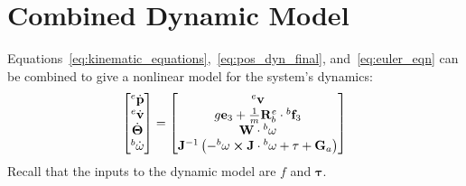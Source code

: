 \documentclass{article}
\begin{document}
		
	\section*{Combined Dynamic Model}
		Equations~\ref{eq:kinematic_equations},~\ref{eq:pos_dyn_final}, and~\ref{eq:euler_eqn} can be combined to give a nonlinear model for the system's dynamics:
		\begin{equation}
			\begin{bmatrix} {}^e \dot{\mathbf{p}} \\ {}^e \dot{\mathbf{v}} \\ \dot{\mathbf{\Theta}} \\ {}^b\dot{\mathbf{\omega}} \end{bmatrix}
			 = 
			 \begin{bmatrix}
			 	{}^e \mathbf{v} \\
			 	g \mathbf{e}_3 + \frac{1}{m}\mathbf{R}_b^e\cdot{}^b\mathbf{f}_3 \\
			 	\mathbf{W} \cdot {}^b\mathbf{\omega} \\
			 	\mathbf{J}^{-1}\left(-{}^b\mathbf{\omega} \cross \mathbf{J}\cdot{}^b\mathbf{\omega} +  \mathbf{\tau} + \mathbf{G}_a\right)
			 \end{bmatrix}
		\end{equation}
		Recall that the inputs to the dynamic model are $f$ and $\mathbf{\tau}$.  
\end{document}
